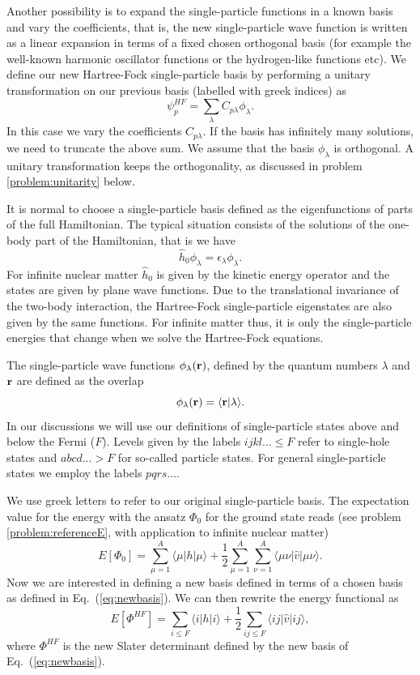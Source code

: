 Another possibility is to expand the single-particle functions in a
known basis and vary the coefficients, that is, the new
single-particle wave function is written as a linear expansion in
terms of a fixed chosen orthogonal basis (for example the well-known
harmonic oscillator functions or the hydrogen-like functions etc).  We
define our new Hartree-Fock single-particle basis by performing a
unitary transformation on our previous basis (labelled with greek
indices) as
\begin{equation}
\psi_p^{HF} = \sum_{\lambda}
C_{p\lambda}\phi_{\lambda}. \label{eq:newbasis}
\end{equation}
In this case we vary the coefficients $C_{p\lambda}$. If the basis has
infinitely many solutions, we need to truncate the above sum.  We
assume that the basis $\phi_{\lambda}$ is orthogonal. A unitary
transformation keeps the orthogonality, as discussed in problem
\ref{problem:unitarity} below.


It is normal to choose a single-particle basis defined as the
eigenfunctions of parts of the full Hamiltonian. The typical situation
consists of the solutions of the one-body part of the Hamiltonian,
that is we have
\[
\hat{h}_0\phi_{\lambda}=\epsilon_{\lambda}\phi_{\lambda}.
\]
For infinite nuclear matter $\hat{h}_0$ is given by the kinetic energy
operator and the states are given by plane wave functions. Due to the
translational invariance of the two-body interaction, the Hartree-Fock
single-particle eigenstates are also given by the same functions. For
infinite matter thus, it is only the single-particle energies that
change when we solve the Hartree-Fock equations.

The single-particle wave functions $\phi_{\lambda}({\bf r})$, defined
by the quantum numbers $\lambda$ and ${\bf r}$ are defined as the
overlap
\[
   \phi_{\lambda}({\bf r}) = \langle {\bf r} | \lambda \rangle .
\]
In our discussions we will use our definitions of single-particle
states above and below the Fermi ($F$).  Levels given by the labels
$ijkl\dots \le F$ refer to single-hole states and $abcd\dots > F$ for
so-called particle states.  For general single-particle states we
employ the labels $pqrs\dots$.




We use greek letters to refer to our original single-particle
basis. The expectation value for the energy with the ansatz $\Phi_0$
for the ground state reads (see problem \ref{problem:referenceE}, with
application to infinite nuclear matter)
\[
  E[\Phi_0] = \sum_{\mu=1}^A \langle \mu | h | \mu \rangle +
  \frac{1}{2}\sum_{{\mu}=1}^A\sum_{{\nu}=1}^A \langle
  \mu\nu|\hat{v}|\mu\nu\rangle.
\]
Now we are interested in defining a new basis defined in terms of a
chosen basis as defined in Eq.~(\ref{eq:newbasis}). We can then
rewrite the energy functional as
\begin{equation}
  E[\Phi^{HF}] = \sum_{i\le F} \langle i | h | i \rangle +
  \frac{1}{2}\sum_{ij\le F}\langle
  ij|\hat{v}|ij\rangle, \label{FunctionalEPhi2}
\end{equation}
where $\Phi^{HF}$ is the new Slater determinant defined by the new
basis of Eq.~(\ref{eq:newbasis}).





